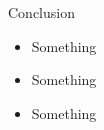 
\begin{frame}{Conclusion}
	\begin{itemize}
		\item Something
		\item Something
		\item Something
	\end{itemize}

\end{frame}